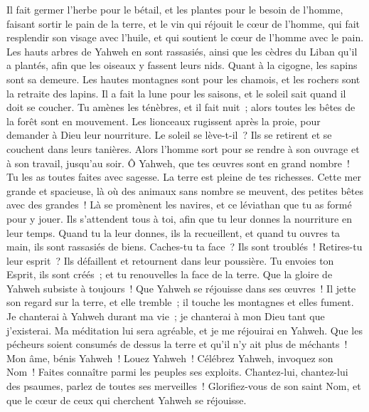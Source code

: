 \begin{multicols}{2}
Il fait germer l'herbe pour le bétail, et les plantes pour le besoin de l'homme, faisant sortir le pain de la terre,
et le vin qui réjouit le cœur de l'homme, qui fait resplendir son visage avec l'huile, et qui soutient le cœur de l'homme avec le pain.
Les hauts arbres de Yahweh en sont rassasiés, ainsi que les cèdres du Liban qu'il a plantés,
afin que les oiseaux y fassent leurs nids. Quant à la cigogne, les sapins sont sa demeure.
Les hautes montagnes sont pour les chamois, et les rochers sont la retraite des lapins.
Il a fait la lune pour les saisons, et le soleil sait quand il doit se coucher.
Tu amènes les ténèbres, et il fait nuit~; alors toutes les bêtes de la forêt sont en mouvement.
Les lionceaux rugissent après la proie, pour demander à Dieu leur nourriture.
Le soleil se lève-t-il~? Ils se retirent et se couchent dans leurs tanières.
Alors l'homme sort pour se rendre à son ouvrage et à son travail, jusqu'au soir.
Ô Yahweh, que tes œuvres sont en grand nombre~! Tu les as toutes faites avec sagesse. La terre est pleine de tes richesses.
Cette mer grande et spacieuse, là où des animaux sans nombre se meuvent, des petites bêtes avec des grandes~!
Là se promènent les navires, et ce léviathan que tu as formé pour y jouer.
Ils s'attendent tous à toi, afin que tu leur donnes la nourriture en leur temps.
Quand tu la leur donnes, ils la recueillent, et quand tu ouvres ta main, ils sont rassasiés de biens.
Caches-tu ta face~? Ils sont troublés~! Retires-tu leur esprit~? Ils défaillent et retournent dans leur poussière.
Tu envoies ton Esprit, ils sont créés~; et tu renouvelles la face de la terre.
Que la gloire de Yahweh subsiste à toujours~! Que Yahweh se réjouisse dans ses œuvres~!
Il jette son regard sur la terre, et elle tremble~; il touche les montagnes et elles fument.
Je chanterai à Yahweh durant ma vie~; je chanterai à mon Dieu tant que j'existerai.
Ma méditation lui sera agréable, et je me réjouirai en Yahweh.
Que les pécheurs soient consumés de dessus la terre et qu'il n'y ait plus de méchants~! Mon âme, bénis Yahweh~! Louez Yahweh~!
\VerseOne{}Célébrez Yahweh, invoquez son Nom~! Faites connaître parmi les peuples ses exploits.
Chantez-lui, chantez-lui des psaumes, parlez de toutes ses merveilles~!
Glorifiez-vous de son saint Nom, et que le cœur de ceux qui cherchent Yahweh se réjouisse.

\end{multicols}
